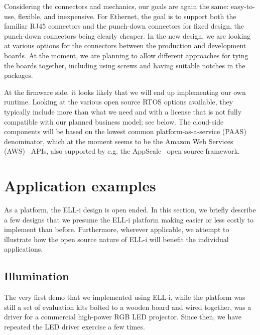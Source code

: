 \documentclass[draft,a4paper]{siamltex}
\begin{document}
Considering the connectors and mechanics, our goals are again the
same: easy-to-use, flexible, and inexpensive.  For Ethernet, the goal
is to support both the familiar RJ45 connectors and the punch-down
connectors for fixed design, the punch-down connectors being clearly
cheaper.  In the new design, we are looking at various options for the
connectors between the production and development boards.  At the
moment, we are planning to allow different approaches for tying the
boards together, including using screws and having suitable notches in
the packages.

At the firmware side, it looks likely that we will end up implementing
our own runtime.  Looking at the various open source RTOS options
available, they typically include more than what we need and with a
license that is not fully compatible with our planned business model;
see below.  The cloud-side components will be based on the lowest
common platform-as-a-service (PAAS) denominator, which at the moment
seems to be the Amazon Web Services (AWS)~\cite{AWS} APIs, also supported by
e.g. the AppScale~\cite{AppScale} open source framework.


\section{Application examples}
\label{sec:examples}

As a platform, the ELL-i design is open ended.  In this section, we
briefly describe a few designs that we presume the ELL-i platform
making easier or less costly to implement than before.  Furthermore,
wherever applicable, we attempt to illustrate how the open source
nature of ELL-i will benefit the individual applications.

\subsection{Illumination}

The very first demo that we implemented using ELL-i, while the
platform was still a set of evaluation kits bolted to a wooden board
and wired together, was a driver for a commercial high-power RGB LED
projector.  Since then, we have repeated the LED driver exercise a few
times.
\end{document}
